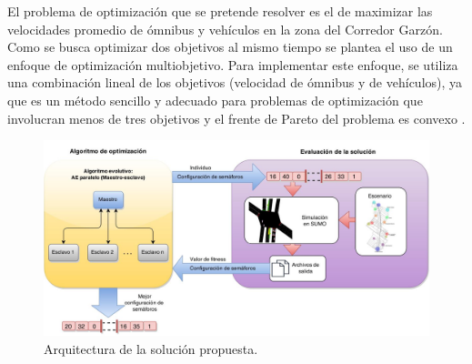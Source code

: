 El problema de optimización que se pretende resolver es el de maximizar las velocidades promedio de ómnibus y vehículos en la zona del Corredor Garzón. Como se busca optimizar dos objetivos al mismo tiempo se plantea el uso de un enfoque de optimización multiobjetivo. Para implementar este enfoque, se utiliza una combinación lineal de los objetivos (velocidad de ómnibus y de vehículos), ya que es un método sencillo y adecuado para problemas de optimización que involucran menos de tres objetivos y el frente de Pareto del problema es convexo \citep{coello2002evolutionary}.



\begin{figure}[ht]
	\centering
	\includegraphics[width=0.99\linewidth]{Figures/arquitectura1}
	\caption{Arquitectura de la solución propuesta.}
	\label{fig:arquitectura1}
\end{figure}

